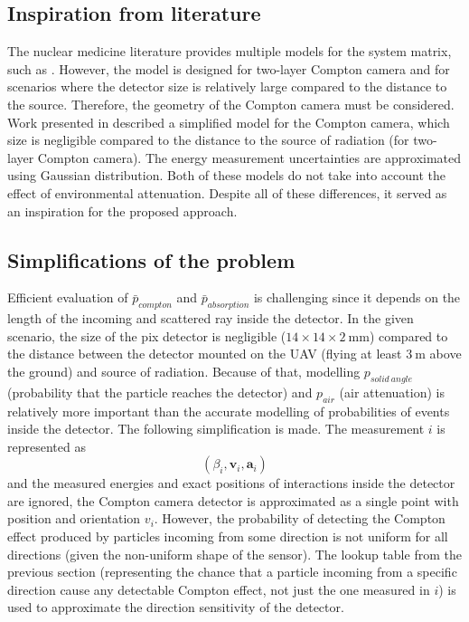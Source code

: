 \subsection{Inspiration from literature}
The nuclear medicine literature provides multiple models for the system matrix, such as \cite{wilderman}. 
However, the model is designed for two-layer Compton camera and for scenarios where the detector size is relatively large compared to the distance to the source. Therefore, the geometry of the Compton camera must be considered.
Work presented in \cite{maxim2016} described a simplified model for the Compton camera, which size is negligible compared to the distance to the source of radiation (for two-layer Compton camera).
The energy measurement uncertainties are approximated using Gaussian distribution.
Both of these models do not take into account the effect of environmental attenuation.
Despite all of these differences, it served as an inspiration for the proposed approach.

\subsection{Simplifications of the problem}
Efficient evaluation of $\bar{p}_{compton}$ and $\bar{p}_{absorption}$ is challenging since it depends on the length of the incoming and scattered ray inside the detector.
In the given scenario, the size of the \ac{pix} detector is negligible ($14 \times 14 \times 2 \ \mathrm{mm}$) compared to the distance between the detector mounted on the \ac{UAV} (flying at least $\SI{3}\meter$ above the ground) and source of radiation.
Because of that, modelling $p_{solid\ angle}$ (probability that the particle reaches the detector) and $p_{air}$ (air attenuation) is relatively more important than the accurate modelling of probabilities of events inside the detector.
The following simplification is made.
The measurement $i$ is represented as
\begin{equation}
  (\beta_{i}, \mathbf{v}_{i}, \mathbf{a}_{i})
\end{equation}
and the measured energies and exact positions of interactions inside the detector are ignored,
the Compton camera detector is approximated as a single point with position and orientation $v_{i}$.
However, the probability of detecting the Compton effect produced by particles incoming from some direction is not uniform for all directions (given the non-uniform shape of the sensor).
The lookup table from the previous section (representing the chance that a particle incoming from a specific direction cause any detectable Compton effect, not just the one measured in $i$) is used to approximate the direction sensitivity of the detector.

